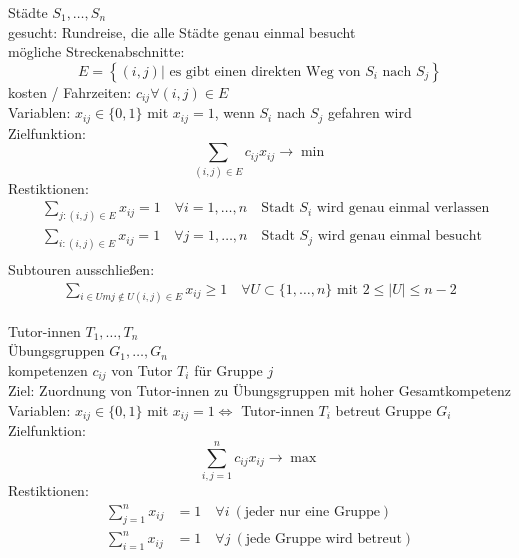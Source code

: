 \begin{beispiel}\enter
	Städte $S_{1},\dots, S_{n}$\\
	gesucht: Rundreise, die alle Städte genau einmal besucht\\
	mögliche Streckenabschnitte:
	\begin{equation*}
		E = \left \{  (i,j) | \text{ es gibt einen direkten Weg von $S_{i}$ nach $S_{j}$}  \right \}
	\end{equation*} 
	kosten / Fahrzeiten: $c_{ij} \forall (i,j) \in E$\\
	Variablen: $x_{ij} \in \{0,1\}$ mit $x_{ij}=1$, wenn $S_{i}$ nach $S_j$ gefahren wird\\
	Zielfunktion: 
	\begin{equation*}
		\sum_{(i,j)\in E}  c_{ij}x_{ij} \rightarrow \min
	\end{equation*} 
	Restiktionen:
	\begin{align*}
		&\sum_{j:(i,j)\in E} x_{ij}=1 \quad \forall i = 1,\dots,n\quad \text{Stadt $S_{i}$ wird genau einmal verlassen}\\
		&\sum_{i:(i,j)\in E} x_{ij}=1 \quad \forall j = 1,\dots,n \quad\text{Stadt $S_{j}$ wird genau einmal besucht}\\
	\end{align*} 
	Subtouren ausschließen:
	\begin{align*}
		\sum_{i\in Um j \not\in U (i,j) \in E} x_{ij} \geq 1 \quad \forall U \subset \{1,\dots,n\} \text{ mit }2\leq |U|\leq n-2
	\end{align*} 
\end{beispiel} 

\begin{beispiel}\enter
	Tutor-innen $T_{1},\dots,T_{n}$ \\
	Übungsgruppen $G_{1},\dots, G_{n}$ \\
	kompetenzen $c_{ij}$ von Tutor $T_{i}$ für Gruppe $j$\\
	Ziel: Zuordnung von Tutor-innen zu Übungsgruppen mit hoher Gesamtkompetenz\\
	Variablen: $x_{ij}\in \{0,1\}$ mit $x_{ij}=1 \iff$ Tutor-innen $T_{i}$ betreut Gruppe $G_{i}$ \\
	Zielfunktion: 
	\begin{equation*}
		\sum_{i,j=1}^{n}  c_{ij}x_{ij} \rightarrow \max 
	\end{equation*} 
	Restiktionen: 
	\begin{align*}
		\sum_{j=1}^{n} x_{ij} &= 1\quad \forall i\ (\text{jeder nur eine Gruppe})\\
		\sum_{i=1}^{n} x_{ij} &= 1\quad \forall j\ (\text{jede Gruppe wird betreut})
	\end{align*} 
\end{beispiel} 

